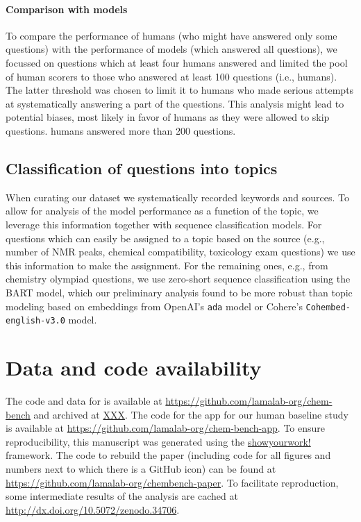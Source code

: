 \documentclass[11pt, oneside]{article}
\begin{document}
\paragraph{Comparison with models}
To compare the performance of humans (who might have answered only some questions) with the performance of models (which answered all questions), we focussed on questions which at least four humans answered and limited the pool of human scorers to those who answered at least 100 questions (i.e.,  humans). 
The latter threshold was chosen to limit it to humans who made serious attempts at systematically answering a part of the questions. 
This analysis might lead to potential biases, most likely in favor of humans as they were allowed to skip questions.  humans answered more than 200 questions.


\subsection{Classification of questions into topics}\label{sec:meth-topic} When curating our dataset we systematically recorded keywords and sources.
To allow for analysis of the model performance as a function of the topic, we leverage this information together with sequence classification models.
For questions which can easily be assigned to a topic based on the source (e.g., number of NMR peaks, chemical compatibility, toxicology exam questions) we use this information to make the assignment.
For the remaining ones, e.g., from chemistry olympiad questions, we use zero-short sequence classification\cite{zeroshotsequence} using the BART model\cite{bart, FacebookBART}, which our preliminary analysis found to be more robust than topic modeling based on embeddings from OpenAI's \texttt{ada} model or Cohere's \texttt{Cohembed-english-v3.0} model.


\section*{Data and code availability}
The code and data for \chembench is available at \url{https://github.com/lamalab-org/chem-bench} and archived at \url{XXX}.
The code for the app for our human baseline study is available at \url{https://github.com/lamalab-org/chem-bench-app}. 
To ensure reproducibility, this manuscript was generated using the \href{https://show-your.work/en/latest/}{showyourwork!} framework.\cite{Luger2021}
The code to rebuild the paper (including code for all figures and numbers next to which there is a GitHub icon) can be found at \url{https://github.com/lamalab-org/chembench-paper}. 
To facilitate reproduction, some intermediate results of the analysis are cached at \url{http://dx.doi.org/10.5072/zenodo.34706}.
\end{document}
